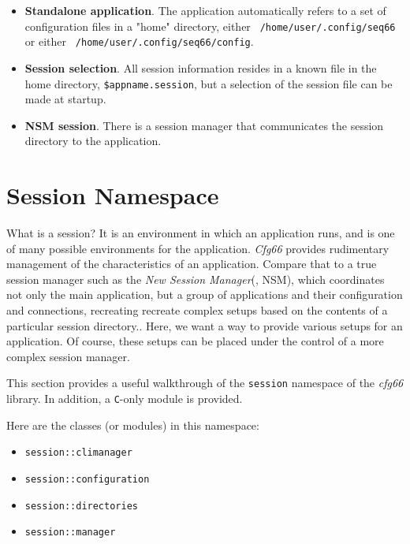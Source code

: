    \begin{itemize}
      \item \textbf{Standalone application}.
         The application automatically refers to a set of configuration files
         in a "home" directory,
         either \texttt{~/home/user/.config/seq66} or
         either \texttt{~/home/user/.config/seq66/config}.
      \item \textbf{Session selection}.
         All session information resides in a known file in the home
         directory, \texttt{\$appname.session}, but a selection of the session
         file can be made at startup.
      \item \textbf{NSM session}.
         There is a session manager that communicates the session directory
         to the application.
   \end{itemize}

\section{Session Namespace}
\label{sec:session_namespace}

   What is a session?
   It is an environment in which an application runs, and is one of many
   possible environments for the application.
   \textsl{Cfg66} provides rudimentary management of the characteristics of
   an application. Compare that to a true session manager such as the
   \textsl{New Session Manager}(\cite{nsm}, NSM), which coordinates not only
   the main application, but a group of applications and their configuration
   and connections, recreating recreate complex setups based on the
   contents of a particular session directory..
   Here, we want a way to provide various setups for an application.
   Of course, these setups can be placed under the control of a more complex
   session manager.

   This section provides a useful walkthrough of the \texttt{session} namespace of
   the \textsl{cfg66} library.
   In addition, a \texttt{C}-only module is provided.

   Here are the classes (or modules) in this namespace:

   \begin{itemize}
      \item \texttt{session::climanager}
      \item \texttt{session::configuration}
      \item \texttt{session::directories}
      \item \texttt{session::manager}
   \end{itemize}

